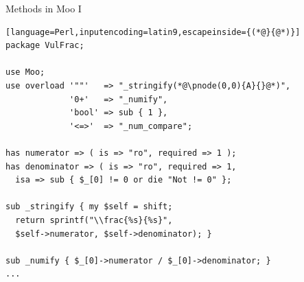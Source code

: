 \documentclass[ngerman,xcolor={table,dvipsnames},smaller,compress,hyperref={bookmarks,colorlinks}]{beamer}
\begin{document}
\begin{frame}[t,fragile]

\begin{columns}[t]
\begin{column}{.8\textwidth}
\begin{block}{Methods in Moo I}
\scriptsize
\begin{lstlisting}[language=Perl,inputencoding=latin9,escapeinside={(*@}{@*)}]
package VulFrac;

use Moo;
use overload '""'   => "_stringify(*@\pnode(0,0){A}{}@*)",
             '0+'   => "_numify",
             'bool' => sub { 1 },
             '<=>'  => "_num_compare";

has numerator => ( is => "ro", required => 1 );
has denominator => ( is => "ro", required => 1,
  isa => sub { $_[0] != 0 or die "Not != 0" };

sub _stringify { my $self = shift;
  return sprintf("\\frac{%s}{%s}",
  $self->numerator, $self->denominator); }

sub _numify { $_[0]->numerator / $_[0]->denominator; }
...
\end{lstlisting}
\end{block}
\end{column}

\begin{column}{.18\textwidth}
\end{column}
\end{columns}


\end{frame}
\end{document}
